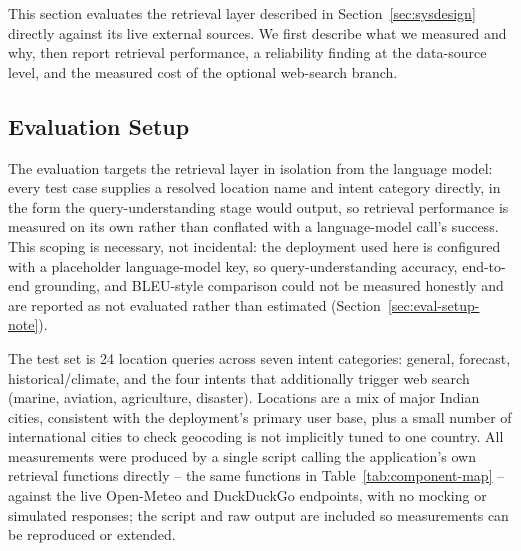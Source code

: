 \documentclass[sigconf,natbib=true,anonymous=true]{acmart}
\begin{document}
This section evaluates the retrieval layer described in Section~\ref{sec:sysdesign} directly against its live external sources. We first describe what we measured and why, then report retrieval performance, a reliability finding at the data-source level, and the measured cost of the optional web-search branch.

\subsection{Evaluation Setup}

The evaluation targets the retrieval layer in isolation from the language model: every test case supplies a resolved location name and intent category directly, in the form the query-understanding stage would output, so retrieval performance is measured on its own rather than conflated with a language-model call's success. This scoping is necessary, not incidental: the deployment used here is configured with a placeholder language-model key, so query-understanding accuracy, end-to-end grounding, and BLEU-style comparison could not be measured honestly and are reported as not evaluated rather than estimated (Section~\ref{sec:eval-setup-note}).

The test set is 24 location queries across seven intent categories: general, forecast, historical/climate, and the four intents that additionally trigger web search (marine, aviation, agriculture, disaster). Locations are a mix of major Indian cities, consistent with the deployment's primary user base, plus a small number of international cities to check geocoding is not implicitly tuned to one country. All measurements were produced by a single script calling the application's own retrieval functions directly -- the same functions in Table~\ref{tab:component-map} -- against the live Open-Meteo and DuckDuckGo endpoints, with no mocking or simulated responses; the script and raw output are included so measurements can be reproduced or extended.
\end{document}
